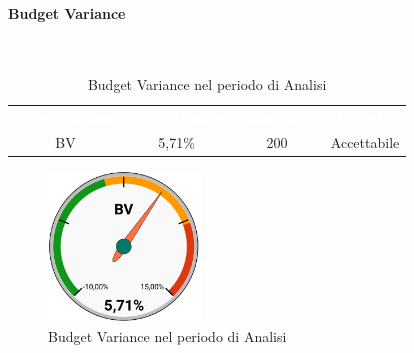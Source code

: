 \paragraph{Budget Variance}\mbox{}\\[0,3cm]
\begin{table}[H]
    \centering
    \begin{tabular}{cccc}
        \rowcolor{greySWEight}
        \textcolor{white}{\textbf{Abbreviazione}} &
        \textcolor{white}{\textbf{Valore Indice}}&
        \textcolor{white}{\textbf{Valore in €}}&
        \textcolor{white}{\textbf{Riscontro}}\\
        BV & 5,71\% & 200 & \textcolor{YellowOrange}{Accettabile}\\
    \end{tabular}
    \caption{Budget Variance nel periodo di Analisi}
\end{table}
\begin{figure}[H]
    \centering
	\includegraphics[height=4cm]{sez/App_Esito/graph/AN_BV.pdf}
	\caption{Budget Variance nel periodo di Analisi}
\end{figure}